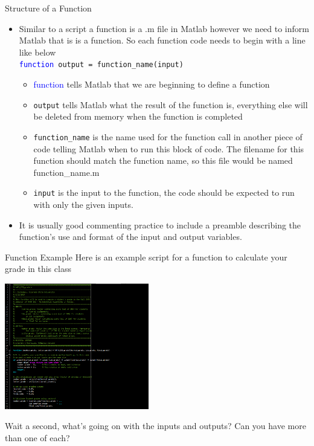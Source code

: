 {}\documentclass[letterpaper,
compress,
xcolor=x11names,
]{beamer}
\begin{document}
\begin{frame}{Structure of a Function}
	\footnotesize
	\begin{itemize}
		\item Similar to a script a function is a .m file in Matlab however we need to inform Matlab that is is a function. So each function code needs to begin with a line like below\\
		\texttt{\textcolor{blue}{function} output = function\_name(input)}
		\begin{itemize}
			\item<2-> \textcolor{blue}{function} tells Matlab that we are beginning to define a function
			\item<3-> \texttt{output} tells Matlab what the result of the function is, everything else will be deleted from memory when the function is completed
			\item<4-> \texttt{function\_name} is the name used for the function call in another piece of code telling Matlab when to run this block of code. The filename for this function should match the function name, so this file would be named function\_name.m
			\item<5-> \texttt{input} is the input to the function, the code should be expected to run with only the given inputs.
		\end{itemize}
		\item<6-> It is usually good commenting practice to include a preamble describing the function's use and format of the input and output variables.
	\end{itemize}
\end{frame}

\begin{frame}{Function Example}
	Here is an example script for a function to calculate your grade in this class
	\begin{center}
		\includegraphics[height = 5.5cm]{function_example.png}
	\end{center}
	Wait a second, what's going on with the inputs and outputs? Can you have more than one of each?
\end{frame}
\end{document}
